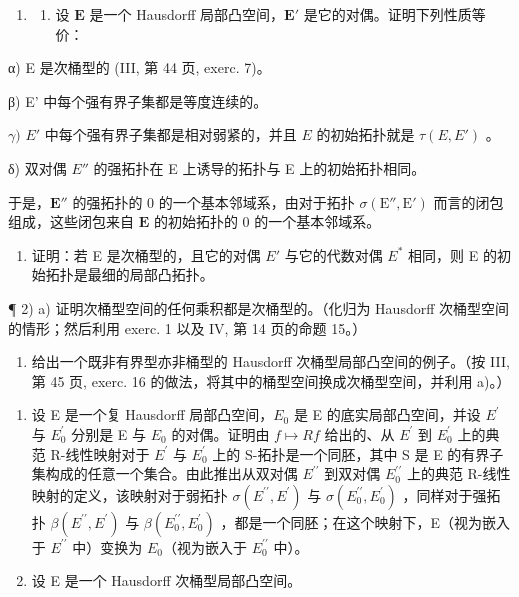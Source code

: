 \exercisegroup

\begin{enumerate}
\def\labelenumi{\arabic{enumi})}
\tightlist
\item
  \begin{enumerate}
  \def\labelenumii{\alph{enumii})}
  \tightlist
  \item
    设 \(\mathbf{E}\) 是一个 Hausdorff 局部凸空间，\(\mathbf{E}'\) 是它的对偶。证明下列性质等价：
  \end{enumerate}
\end{enumerate}

α) E 是次桶型的 (III, 第 44 页, exerc. 7)。

β) E' 中每个强有界子集都是等度连续的。

\(\gamma)\) \(E'\) 中每个强有界子集都是相对弱紧的，并且 \(E\) 的初始拓扑就是 \(\tau(E, E')\) 。

δ) 双对偶 \(E''\) 的强拓扑在 E 上诱导的拓扑与 E 上的初始拓扑相同。

于是，\(\mathbf{E}''\) 的强拓扑的 0 的一个基本邻域系，由对于拓扑 \(\sigma (\mathrm{E}'', \mathrm{E}')\) 而言的闭包组成，这些闭包来自 \(\mathbf{E}\) 的初始拓扑的 0 的一个基本邻域系。

\begin{enumerate}
\def\labelenumi{\alph{enumi})}
\setcounter{enumi}{1}
\tightlist
\item
  证明：若 E 是次桶型的，且它的对偶 \(E'\) 与它的代数对偶 \(E^{*}\) 相同，则 E 的初始拓扑是最细的局部凸拓扑。
\end{enumerate}

¶ 2) a) 证明次桶型空间的任何乘积都是次桶型的。（化归为 Hausdorff 次桶型空间的情形；然后利用 exerc. 1 以及 IV, 第 14 页的命题 15。）

\begin{enumerate}
\def\labelenumi{\alph{enumi})}
\setcounter{enumi}{1}
\tightlist
\item
  给出一个既非有界型亦非桶型的 Hausdorff 次桶型局部凸空间的例子。（按 III, 第 45 页, exerc. 16 的做法，将其中的桶型空间换成次桶型空间，并利用 a)。）
\end{enumerate}

\begin{enumerate}
\def\labelenumi{\arabic{enumi})}
\setcounter{enumi}{2}
\item
  设 E 是一个复 Hausdorff 局部凸空间，\(E_{0}\) 是 E 的底实局部凸空间，并设 \(E^{\prime}\) 与 \(E_{0}^{\prime}\) 分别是 E 与 \(E_{0}\) 的对偶。证明由 \(f \mapsto Rf\) 给出的、从 \(E^{\prime}\) 到 \(E_{0}^{\prime}\) 上的典范 R-线性映射对于 \(E^{\prime}\) 与 \(E_{0}^{\prime}\) 上的 S-拓扑是一个同胚，其中 S 是 E 的有界子集构成的任意一个集合。由此推出从双对偶 \(E^{\prime\prime}\) 到双对偶 \(E_{0}^{\prime\prime}\) 上的典范 R-线性映射的定义，该映射对于弱拓扑 \(\sigma(E^{\prime\prime}, E^{\prime})\) 与 \(\sigma(E_{0}^{\prime\prime}, E_{0}^{\prime})\) ，同样对于强拓扑 \(\beta(E^{\prime\prime}, E^{\prime})\) 与 \(\beta(E_{0}^{\prime\prime}, E_{0}^{\prime})\) ，都是一个同胚；在这个映射下，E（视为嵌入于 \(E^{\prime\prime}\) 中）变换为 \(E_{0}\)（视为嵌入于 \(E_{0}^{\prime\prime}\) 中）。
\item
  设 E 是一个 Hausdorff 次桶型局部凸空间。
\end{enumerate}

